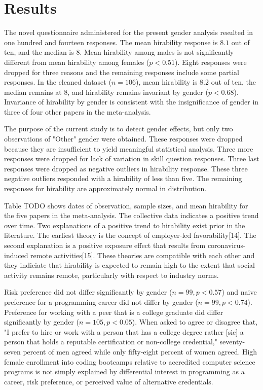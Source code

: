 \documentclass[review]{elsarticle}
\begin{document}
\section{Results}

The novel questionnaire administered for the present gender analysis resulted in one hundred and fourteen responses.
The mean hirability response is $8.1$ out of ten, and the median is $8$.
Mean hirability among males is not significantly different from mean hirability among females ($p < 0.51$).
Eight responses were dropped for three reasons and the remaining responses include some partial responses.
In the cleaned dataset ($n = 106$), mean hirability is $8.2$ out of ten,
the median remains at $8$, and hirability remains invariant by gender ($p < 0.68$).
Invariance of hirability by gender is consistent with the insignificance of gender in three of four other papers in the meta-analysis.

The purpose of the current study is to detect gender effects, but only two observations of "Other" gender were obtained.
These responses were dropped because they are insufficient to yield meaningful statistical analysis.
Three more responses were dropped for lack of variation in skill question responses.
Three last responses were dropped as negative outliers in hirability response.
These three negative outliers responded with a hirability of less than five.
The remaining responses for hirability are approximately normal in distribution.

Table TODO shows dates of observation, sample sizes, and mean hirability for the five papers in the meta-analysis.
The collective data indicates a positive trend over time.
Two explanations of a positive trend to hirability exist prior in the literature.
The earliest theory is the concept of employer-led favorability[14].
The second explanation is a positive exposure effect that results from coronavirus-induced remote activities[15].
These theories are compatible with each other and they indiciate that hirability is expected to remain high
to the extent that social activity remains remote, particularly with respect to industry norms.

Risk preference did not differ significantly by gender ($n = 99, p < 0.57$)
and naive preference for a programming career did not differ by gender ($n = 99, p < 0.74$).
Preference for working with a peer that is a college graduate did differ significantly by gender ($n = 105, p < 0.05$).
When asked to agree or disagree that, "I prefer to hire or work with a person that has a college degree
rather [sic] a person that holds a reputable certification or non-college credential,"
seventy-seven percent of men agreed while only fifty-eight percent of women agreed.
High female enrollment into coding bootcamps
relative to accredited computer science programs is not simply explained
by differential interest in programming as a career,
risk preference,
or perceived value of alternative credentials.
\end{document}
